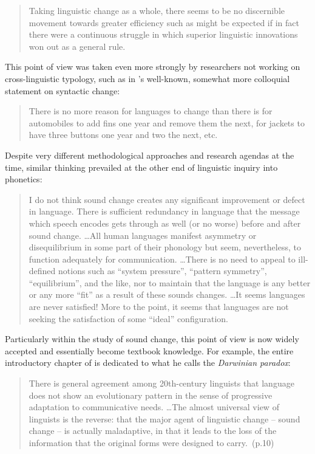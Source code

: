 \begin{quote}
Taking linguistic change as a whole, there seems to be no discernible movement towards greater efficiency such as might be expected if in fact there were a continuous struggle in which superior linguistic innovations won out as a general rule.~\citep[p.69]{Greenberg1959}
\end{quote}

This point of view was taken even more strongly by researchers not working on cross-linguistic typology, such as in \citeauthor{Postal1968}'s well-known, somewhat more colloquial statement on syntactic change:

\begin{quote}
There is no more reason for languages to change than there is for automobiles to add fins one year and remove them the next, for jackets to have three buttons one year and two the next, etc.~\citep[p.283]{Postal1968}
\end{quote}

Despite very different methodological approaches and research agendas at the time, similar thinking prevailed at the other end of linguistic inquiry into phonetics:

\begin{quote}
I do not think sound change creates any significant improvement or defect in language. There is sufficient redundancy in language that the message which speech encodes gets through as well (or no worse) before and after sound change. \ldots All human languages manifest asymmetry or disequilibrium in some part of their phonology but seem, nevertheless, to function adequately for communication. \ldots There is no need to appeal to ill-defined notions such as ``system pressure'', ``pattern symmetry'', ``equilibrium'', and the like, nor to maintain that the language is any better or any more ``fit'' as a result of these sounds changes. \ldots It seems languages are never satisfied! More to the point, it seems that languages are not seeking the satisfaction of some ``ideal'' configuration.~\citep[p.191-192]{Ohala1989}
\end{quote}

Particularly within the study of sound change, this point of view is now widely accepted and essentially become textbook knowledge. For example, the entire introductory chapter of \citet{Labov2001} is dedicated to what he calls the \emph{Darwinian paradox}: 

\begin{quote}
There is general agreement among 20th-century linguists that language does not show an evolutionary pattern in the sense of progressive adaptation to communicative needs. \ldots The almost universal view of linguists is the reverse: that the major agent of linguistic change -- sound change -- is actually maladaptive, in that it leads to the loss of the information that the original forms were designed to carry.~(p.10)
\end{quote}

